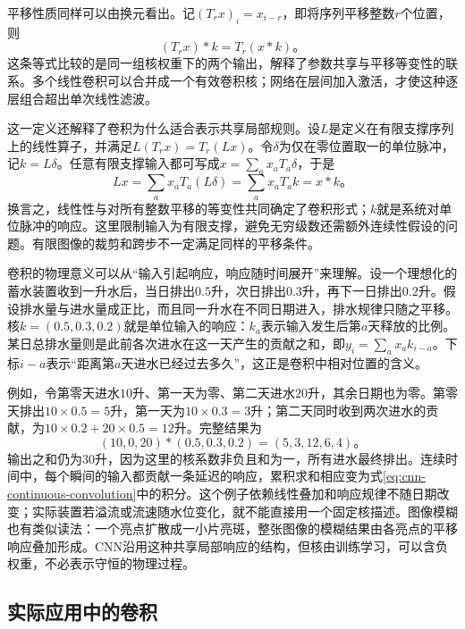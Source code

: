平移性质同样可以由换元看出。记$(T_r x)_i=x_{i-r}$，即将序列平移整数$r$个位置，则
\begin{equation}
  (T_r x)*k=T_r(x*k)\text{。}
  \label{eq:cnn-convolution-equivariance}
\end{equation}
这条等式比较的是同一组核权重下的两个输出，解释了参数共享与平移等变性的联系。多个线性卷积可以合并成一个有效卷积核；网络在层间加入激活，才使这种逐层组合超出单次线性滤波。

这一定义还解释了卷积为什么适合表示共享局部规则。设$L$是定义在有限支撑序列上的线性算子，并满足$L(T_r x)=T_r(Lx)$。令$\delta$为仅在零位置取一的单位脉冲，记$k=L\delta$。任意有限支撑输入都可写成$x=\sum_a x_aT_a\delta$，于是
\begin{equation}
  Lx=\sum_a x_aT_a(L\delta)=\sum_a x_aT_a k=x*k\text{。}
  \label{eq:cnn-lsi-convolution}
\end{equation}
换言之，线性性与对所有整数平移的等变性共同确定了卷积形式；$k$就是系统对单位脉冲的响应。这里限制输入为有限支撑，避免无穷级数还需额外连续性假设的问题。有限图像的裁剪和跨步不一定满足同样的平移条件。

卷积的物理意义可以从“输入引起响应，响应随时间展开”来理解。设一个理想化的蓄水装置收到一升水后，当日排出$0.5$升，次日排出$0.3$升，再下一日排出$0.2$升。假设排水量与进水量成正比，而且同一升水在不同日期进入，排水规律只随之平移。核$k=(0.5,0.3,0.2)$就是单位输入的响应：$k_a$表示输入发生后第$a$天释放的比例。某日总排水量则是此前各次进水在这一天产生的贡献之和，即$y_i=\sum_a x_a k_{i-a}$。下标$i-a$表示“距离第$a$天进水已经过去多久”，这正是卷积中相对位置的含义。

例如，令第零天进水$10$升、第一天为零、第二天进水$20$升，其余日期也为零。第零天排出$10\times0.5=5$升，第一天为$10\times0.3=3$升；第二天同时收到两次进水的贡献，为$10\times0.2+20\times0.5=12$升。完整结果为
\begin{equation}
  (10,0,20)*(0.5,0.3,0.2)=(5,3,12,6,4)\text{。}
  \label{eq:cnn-physical-convolution-example}
\end{equation}
输出之和仍为$30$升，因为这里的核系数非负且和为一，所有进水最终排出。连续时间中，每个瞬间的输入都贡献一条延迟的响应，累积求和相应变为式\eqref{eq:cnn-continuous-convolution}中的积分。这个例子依赖线性叠加和响应规律不随日期改变；实际装置若溢流或流速随水位变化，就不能直接用一个固定核描述。图像模糊也有类似读法：一个亮点扩散成一小片亮斑，整张图像的模糊结果由各亮点的平移响应叠加形成。CNN沿用这种共享局部响应的结构，但核由训练学习，可以含负权重，不必表示守恒的物理过程。

\subsection{实际应用中的卷积}
\label{sec:cnn-practical-convolution}

